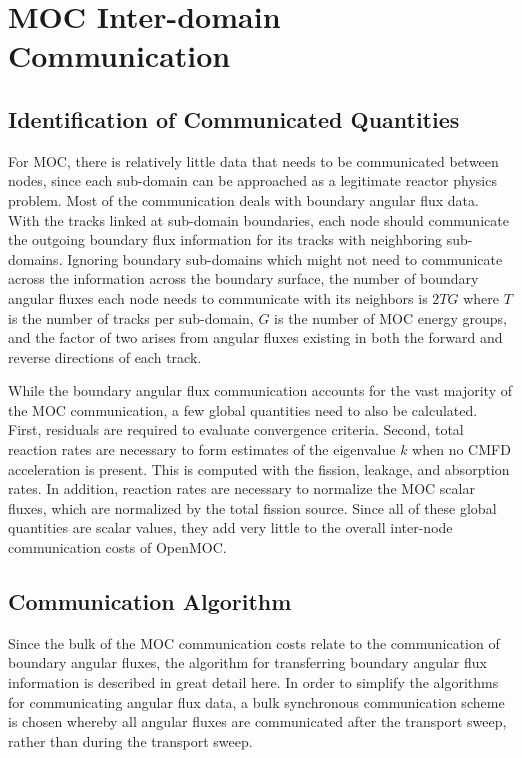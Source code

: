 \newpage

\section{MOC Inter-domain Communication}
\label{sec:moc-dd}

\subsection{Identification of Communicated Quantities}

For \ac{MOC}, there is relatively little data that needs to be communicated between nodes, since each sub-domain can be approached as a legitimate reactor physics problem. Most of the communication deals with boundary angular flux data. With the tracks linked at sub-domain boundaries, each node should communicate the outgoing boundary flux information for its tracks with neighboring sub-domains. Ignoring boundary sub-domains which might not need to communicate across the information across the boundary surface, the number of boundary angular fluxes each node needs to communicate with its neighbors is $2TG$ where $T$ is the number of tracks per sub-domain, $G$ is the number of \ac{MOC} energy groups, and the factor of two arises from angular fluxes existing in both the forward and reverse directions of each track.

While the boundary angular flux communication accounts for the vast majority of the \ac{MOC} communication, a few global quantities need to also be calculated. First, residuals are required to evaluate convergence criteria. Second, total reaction rates are necessary to form estimates of the eigenvalue $k$ when no  \ac{CMFD} acceleration is present. This is computed with the fission, leakage, and absorption rates. In addition, reaction rates are necessary to normalize the \ac{MOC} scalar fluxes, which are normalized by the total fission source. Since all of these global quantities are scalar values, they add very little to the overall inter-node communication costs of OpenMOC.

\subsection{Communication Algorithm}

Since the bulk of the \ac{MOC} communication costs relate to the communication of boundary angular fluxes, the algorithm for transferring boundary angular flux information is described in great detail here. In order to simplify the algorithms for communicating angular flux data, a bulk synchronous communication scheme is chosen whereby all angular fluxes are communicated after the transport sweep, rather than during the transport sweep. 

